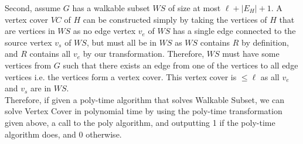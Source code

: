 \documentclass[letterpaper,notitlepage,twoside]{article}
\begin{document}
Second, assume $G$ has a walkable subset $WS$ of size at most $\ell + |E_H| + 1$. A vertex cover $VC$ of $H$ can be constructed simply by taking the vertices of $H$ that are vertices in $WS$ as no edge vertex $v_e$ of $WS$ has a single edge connected to the source vertex $v_s$ of $WS$, but must all be in $WS$ as $WS$ contains $R$ by definition, and $R$ contains all $v_e$ by our transformation. Therefore, $WS$ must have some vertices from $G$ such that there exists an edge from one of the vertices to all edge vertices i.e. the vertices form a vertex cover. This vertex cover is $\leq \ell$ as all $v_e$ and $v_s$ are in $WS$. \\
Therefore, if given a poly-time algorithm that solves Walkable Subset, we can solve Vertex Cover in polynomial time by using the poly-time transformation given above, a call to the poly algorithm, and outputting 1 if the poly-time algorithm does, and 0 otherwise.
\end{document}

